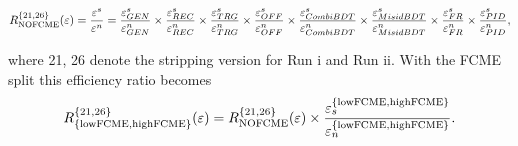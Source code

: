 \hspace*{-1.0cm}\begin{equation}
	R_{\rm{NOFCME}}^{\{21,26\}}(\varepsilon)=\frac{\varepsilon^{s}}{\varepsilon^{n}}=\frac{\varepsilon_{GEN}^{s}}{\varepsilon_{GEN}^{n}} \times \frac{\varepsilon_{REC}^{s}}{\varepsilon_{REC}^{n}} \times \frac{\varepsilon_{TRG}^{s}}{\varepsilon_{TRG}^{n}} \times \frac{\varepsilon_{OFF}^{s}}{\varepsilon_{OFF}^{n}} \times \frac{\varepsilon_{CombiBDT}^{s}}{\varepsilon_{CombiBDT}^{n}} \times \frac{\varepsilon_{MisidBDT}^{s}}{\varepsilon_{MisidBDT}^{n}} \times \frac{\varepsilon_{FR}^{s}}{\varepsilon_{FR}^{n}} \times \frac{\varepsilon_{PID}^{s}}{\varepsilon_{PID}^{n}},
\label{eq:notsplitted}
\end{equation}



\noindent where 21, 26 denote the stripping version for Run \Rn{1} and Run \Rn{2}. With the FCME split this efficiency ratio becomes
\begin{equation}
	R^{\{21,26\}}_{\mathrm{\{lowFCME,highFCME\}}}(\varepsilon)=R_{\rm{NOFCME}}^{\{21,26\}}(\varepsilon)\times\frac{\varepsilon^{\mathrm{\{lowFCME,highFCME\}}}_{s}}{\varepsilon^{\mathrm{\{lowFCME,highFCME\}}}_{n}}.
\label{eq:splitted}
\end{equation}

